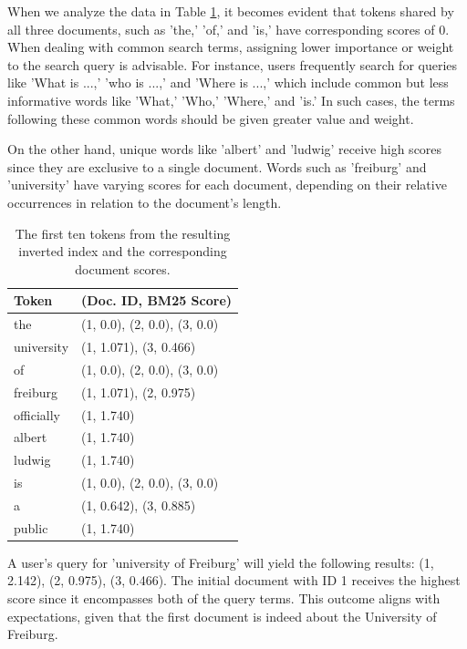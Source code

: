 When we analyze the data in Table \ref{table:bm25-result}, it becomes evident that tokens shared by all three documents, such as 'the,' 'of,' and 'is,' have corresponding scores of 0. When dealing with common search terms, assigning lower importance or weight to the search query is advisable. For instance, users frequently search for queries like 'What is ...,' 'who is ...,' and 'Where is ...,' which include common but less informative words like 'What,' 'Who,' 'Where,' and 'is.' In such cases, the terms following these common words should be given greater value and weight.

On the other hand, unique words like 'albert' and 'ludwig' receive high scores since they are exclusive to a single document. Words such as 'freiburg' and 'university' have varying scores for each document, depending on their relative occurrences in relation to the document's length.

\begin{table}[ht] 
{\footnotesize
\begin{tabular}{ |p{2.5cm}||p{10.3cm}|  }
 \hline \hline
\textbf{Token} & \textbf{(Doc. ID, BM25 Score)}\T\B 
\\ 
\hline
the & (1, 0.0), (2, 0.0), (3, 0.0) \T\B 
\\ 
\hline
university &  (1, 1.071), (3, 0.466) \T\B 
\\ 
\hline
of  &  (1, 0.0), (2, 0.0), (3, 0.0) \T\B 
\\
\hline
freiburg  &  (1, 1.071), (2, 0.975) \T\B 
\\ 
\hline
officially  &  (1, 1.740) \T\B 
\\ 
\hline
albert  & (1, 1.740)\T\B 
\\ 
\hline
ludwig  &  (1, 1.740) \T\B 
\\ 
\hline
is  & (1, 0.0), (2, 0.0), (3, 0.0) \T\B 
\\ 
\hline
a  & (1, 0.642), (3, 0.885) \T\B 
\\ 
\hline
public  &  (1, 1.740) \T\B 
\\ 
\hline \hline
    \end{tabular}
}
  \captionsetup{justification=centering,margin=2cm}
  \caption{The first ten tokens from the resulting inverted index and the corresponding document scores. }
  \label{table:bm25-result}
\end{table}

A user's query for 'university of Freiburg' will yield the following results: (1, 2.142), (2, 0.975), (3, 0.466). The initial document with ID 1 receives the highest score since it encompasses both of the query terms. This outcome aligns with expectations, given that the first document is indeed about the University of Freiburg.

